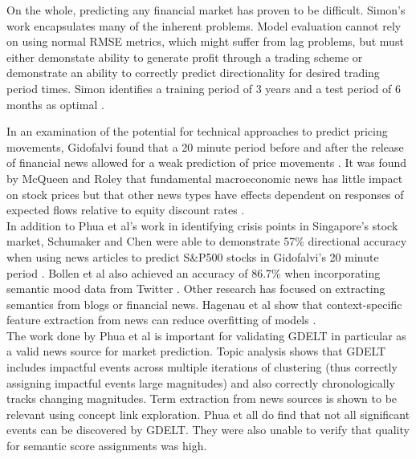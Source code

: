 On the whole, predicting any financial market has proven to be difficult. Simon's work encapsulates many of the inherent problems. Model evaluation cannot rely on using normal RMSE metrics, which might suffer from lag problems, but must either demonstate ability to generate profit through a trading scheme or demonstrate an ability to correctly predict directionality for desired trading period times. Simon identifies a training period of 3 years and a test period of 6 months as optimal \cite{forex_neuralnets}.

\noindent In an examination of the potential for technical approaches to predict pricing movements, Gidofalvi found that a 20 minute period before and after the release of financial news allowed for a weak prediction of price movements \cite{gidofalvi2001using}. It was found by McQueen and Roley that fundamental macroeconomic news has little impact on stock prices but that other news types have effects dependent on responses of expected flows relative to equity discount rates \cite{mcqueen1993stock}.\\

\noindent In addition to Phua et al's work in identifying crisis points in Singapore's stock market, Schumaker and Chen were able to demonstrate 57\% directional accuracy when using news articles to predict S\&P500 stocks in Gidofalvi's 20 minute period \cite{schumaker2009technical}. Bollen et al also achieved an accuracy of 86.7\% when incorporating semantic mood data from Twitter \cite{bollen2011twitter}. Other research has focused on extracting semantics from blogs or financial news. Hagenau et al show that context-specific feature extraction from news can reduce overfitting of models \cite{hagenau2012automated}.\\

\noindent The work done by Phua et al is important for validating GDELT in particular as a valid news source for market prediction. Topic analysis shows that GDELT includes impactful events across multiple iterations of clustering (thus correctly assigning impactful events large magnitudes) and also correctly chronologically tracks changing magnitudes. Term extraction from news sources is shown to be relevant using concept link exploration. Phua et all do find that not all significant events can be discovered by GDELT. They were also unable to verify that quality for semantic score assignments was high.